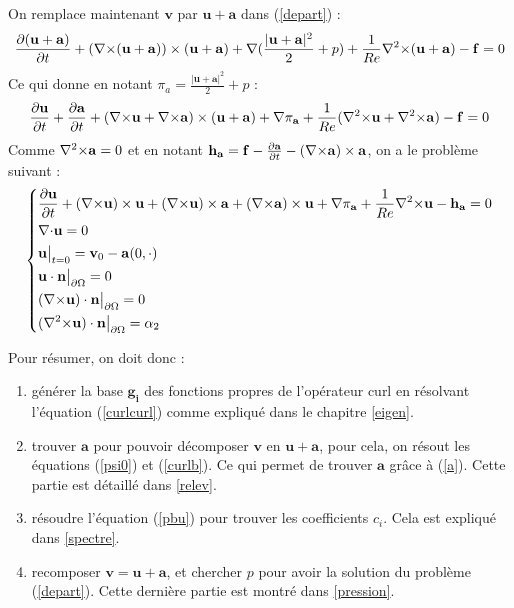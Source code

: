 On remplace maintenant $\mathbf{v}$ par $\mathbf{u}+\mathbf{a}$ dans (\ref{depart}) :
\[ \frac{\partial(\mathbf{u}+\mathbf{a})}{\partial t}+({\nabla\times}(\mathbf{u}+\mathbf{a}))\times(\mathbf{u}+\mathbf{a}) + {\nabla} (\frac{|\mathbf{u}+\mathbf{a}|^2}{2}+p) + \frac{1}{Re}{\nabla^2\times}(\mathbf{u}+\mathbf{a}) - \mathbf{f} = 0 \]
Ce qui donne en notant $\pi_a=\frac{|\mathbf{u}+\mathbf{a}|^2}{2}+p$ :
\[ \frac{\partial \mathbf{u}}{\partial t}+\frac{\partial \mathbf{a}}{\partial t} + ({\nabla\times} \mathbf{u}+{\nabla\times} \mathbf{a})\times(\mathbf{u}+\mathbf{a}) + {\nabla}\pi_{\mathbf{a}} + \frac{1}{Re}({\nabla^2\times} \mathbf{u}+{\nabla^2\times} \mathbf{a}) - \mathbf{f} = 0 \]
Comme ${\nabla^2\times} \mathbf{a} = 0$ et en notant $\mathbf{h_a}=\mathbf{f}-\frac{\partial \mathbf{a}}{\partial t} - ({\nabla\times} \mathbf{a})\times \mathbf{a}$, on a le problème suivant :
\begin{equation}\label{pbu}
\left\{\begin{aligned}
&\frac{\partial \mathbf{u}}{\partial t} + ({\nabla\times} \mathbf{u})\times \mathbf{u} + ({\nabla\times} \mathbf{u})\times \mathbf{a} +({\nabla\times} \mathbf{a})\times \mathbf{u} + {\nabla} \pi_{\mathbf{a}} +\frac{1}{Re}{\nabla^2\times}  \mathbf{u} - \mathbf{h_a} = 0\\
&{\nabla\cdot} \mathbf{u} = 0\\
&\mathbf{u}\big\rvert_{t=0} = \mathbf{v}_0 - \mathbf{a}(0,\cdot)\\
&\mathbf{u}\cdot \mathbf{n}{\big\rvert_{\partial\Omega}} = 0\\
&({\nabla\times} \mathbf{u})\cdot \mathbf{n}{\big\rvert_{\partial\Omega}} = 0\\
&({\nabla^2\times}  \mathbf{u})\cdot \mathbf{n}{\big\rvert_{\partial\Omega}} = \alpha_2
\end{aligned}\right.
\end{equation}

Pour résumer, on doit donc :
\begin{enumerate}
\item générer la base $\mathbf{g_i}$ des fonctions propres de l'opérateur curl en résolvant l'équation (\ref{curlcurl}) comme expliqué dans le chapitre \ref{eigen}.
\item trouver $\mathbf{a}$ pour pouvoir décomposer $\mathbf{v}$ en $\mathbf{u}+\mathbf{a}$, pour cela, on résout les équations (\ref{psi0}) et (\ref{curlb}). Ce qui permet de trouver $\mathbf{a}$ grâce à (\ref{a}). Cette partie est détaillé dans \ref{relev}.
\item résoudre l'équation (\ref{pbu}) pour trouver les coefficients $c_i$. Cela est expliqué dans \ref{spectre}.
\item recomposer $\mathbf{v}=\mathbf{u}+\mathbf{a}$, et chercher $p$ pour avoir la solution du problème (\ref{depart}). Cette dernière partie est montré dans \ref{pression}.
\end{enumerate}


